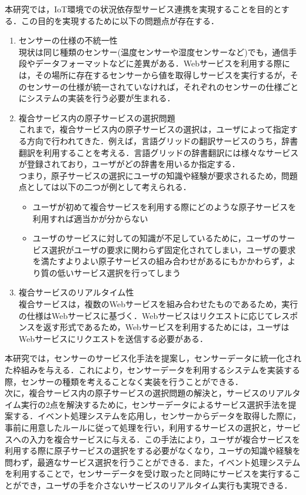 \documentclass{kuisthesis}			%
\begin{document}
本研究では，IoT環境での状況依存型サービス連携を実現することを目的とする．この目的を実現するために以下の問題点が存在する．
\begin{enumerate}
\item センサーの仕様の不統一性\\
現状は同じ種類のセンサー(温度センサーや湿度センサーなど)でも，通信手段やデータフォーマットなどに差異がある．Webサービスを利用する際には，その場所に存在するセンサーから値を取得しサービスを実行するが，そのセンサーの仕様が統一されていなければ，それぞれのセンサーの仕様ごとにシステムの実装を行う必要が生まれる．
\item 複合サービス内の原子サービスの選択問題\\
これまで，複合サービス内の原子サービスの選択は，ユーザによって指定する方向で行われてきた．例えば，言語グリッドの翻訳サービスのうち，辞書翻訳を利用することを考える．言語グリッドの辞書翻訳には様々なサービスが登録されており，ユーザがどの辞書を用いるか指定する．\\
つまり，原子サービスの選択にユーザの知識や経験が要求されるため，問題点としては以下の二つが例として考えられる．
\begin{itemize}
\item ユーザが初めて複合サービスを利用する際にどのような原子サービスを利用すれば適当かが分からない
\item ユーザのサービスに対しての知識が不足しているために，ユーザのサービス選択がユーザの要求に関わらず固定化されてしまい，ユーザの要求を満たすよりよい原子サービスの組み合わせがあるにもかかわらず，より質の低いサービス選択を行ってしまう
\end{itemize}
\item 複合サービスのリアルタイム性\\
複合サービスは，複数のWebサービスを組み合わせたものであるため，実行の仕様はWebサービスに基づく．Webサービスはリクエストに応じてレスポンスを返す形式であるため，Webサービスを利用するためには，ユーザはWebサービスにリクエストを送信する必要がある．
\end{enumerate}
本研究では，センサーのサービス化手法を提案し，センサーデータに統一化された枠組みを与える．これにより，センサーデータを利用するシステムを実装する際，センサーの種類を考えることなく実装を行うことができる．\\
次に，複合サービス内の原子サービスの選択問題の解決と，サービスのリアルタイム実行の2点を解決するために，センサーデータによるサービス選択手法を提案する．イベント処理システムを応用し，センサーからデータを取得した際に，事前に用意したルールに従って処理を行い，利用するサービスの選択と，サービスへの入力を複合サービスに与える．この手法により，ユーザが複合サービスを利用する際に原子サービスの選択をする必要がなくなり，ユーザの知識や経験を問わず，最適なサービス選択を行うことができる．また，イベント処理システムを利用することで，センサーデータを受け取ったと同時にサービスを実行することができ，ユーザの手を介さないサービスのリアルタイム実行も実現できる．\\
\end{document}
